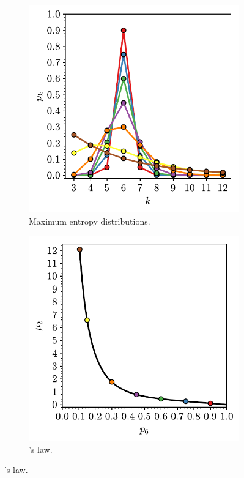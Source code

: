 \begin{figure}[bt]
     \centering
     
     \begin{subfigure}[b]{0.45\textwidth}
         \centering
         \includegraphics[width=\textwidth]{./figures/methods/lm_1.pdf}
         \caption{Maximum entropy distributions.}
         \label{fig:lm1}
     \end{subfigure}
     \hfill
      \begin{subfigure}[b]{0.45\textwidth}
         \centering
         \includegraphics[width=\textwidth]{./figures/methods/lm_2.pdf}
         \caption{\lm's law.}
         \label{fig:lm2}
     \end{subfigure}
     \hfill
     

\end{figure}
